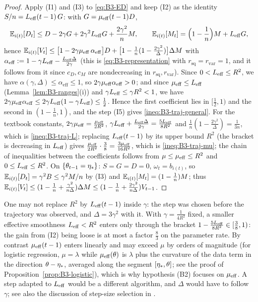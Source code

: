 \begin{proof}
Apply (I1) and (I3) to \eqref{eq:B3-ED} and keep (I2) as the identity $S/n=L_{\mathrm{eff}}(t-1)\,G$: with $G=\mu_{\mathrm{eff}}(t-1)D$,
\[
\mathbb{E}_{i(t)}[D_t]\le D-2\gamma G+2\gamma^2L_{\mathrm{eff}} G+\frac{2\gamma^2}{n}M,\qquad
\mathbb{E}_{i(t)}[M_t]=\Big(1-\frac1n\Big)M+L_{\mathrm{eff}} G,
\]
hence $\mathbb{E}_{i(t)}[V_t]\le\big[1-2\gamma\mu_{\mathrm{eff}}\,\alpha_{\mathrm{eff}}\big]D+\big[1-\frac1n(1-\frac{2\gamma^2}{\Delta})\big]\Delta M$ with $\alpha_{\mathrm{eff}}:=1-\gamma L_{\mathrm{eff}}-\frac{L_{\mathrm{eff}}\Delta}{2\gamma}$ (this is \eqref{eq:B3-representation} with $r_{\mathrm{sq}}=r_{\mathrm{var}}=1$, and it follows from it since $c_D,c_M$ are nondecreasing in $r_{\mathrm{sq}},r_{\mathrm{var}}$). Since $0<L_{\mathrm{eff}}\le R^2$, we have $\alpha(\gamma,\Delta)\le\alpha_{\mathrm{eff}}\le1$, so $2\gamma\mu_{\mathrm{eff}}\alpha_{\mathrm{eff}}>0$; and since $\mu_{\mathrm{eff}}\le L_{\mathrm{eff}}$ (Lemma~\ref{lem:B3-ranges}(i)) and $\gamma L_{\mathrm{eff}}\le\gamma R^2<1$, we have $2\gamma\mu_{\mathrm{eff}}\alpha_{\mathrm{eff}}\le2\gamma L_{\mathrm{eff}}(1-\gamma L_{\mathrm{eff}})\le\frac12$. Hence the first coefficient lies in $[\frac12,1)$ and the second in $(1-\frac1n,1)$, and the step (I5) gives \eqref{ineq:B3-traj-general}. For the textbook constants, $2\gamma\mu_{\mathrm{eff}}=\frac{\mu_{\mathrm{eff}}}{2R^2}$, $\gamma L_{\mathrm{eff}}+\frac{L_{\mathrm{eff}}\Delta}{2\gamma}=\frac{5L_{\mathrm{eff}}}{8R^2}$ and $\frac1n(1-\frac{2\gamma^2}\Delta)=\frac1{3n}$, which is \eqref{ineq:B3-traj-L}; replacing $L_{\mathrm{eff}}(t-1)$ by its upper bound $R^2$ (the bracket is decreasing in $L_{\mathrm{eff}}$) gives $\frac{\mu_{\mathrm{eff}}}{2R^2}\cdot\frac38=\frac{3\mu_{\mathrm{eff}}}{16R^2}$, which is \eqref{ineq:B3-traj-mu}; the chain of inequalities between the coefficients follows from $\mu\le\mu_{\mathrm{eff}}\le R^2$ and $0\le L_{\mathrm{eff}}\le R^2$. On $\{\theta_{t-1}=\eta_\ast\}$: $S=G=D=0$, $\omega_t=b_{i(t)}$, so $\mathbb{E}_{i(t)}[D_t]=\gamma^2B\le\gamma^2M/n$ by (I3) and $\mathbb{E}_{i(t)}[M_t]=(1-\frac1n)M$; thus $\mathbb{E}_{i(t)}[V_t]\le(1-\frac1n+\frac{\gamma^2}{n\Delta})\Delta M\le(1-\frac1n+\frac{2\gamma^2}{n\Delta})V_{t-1}$.
\end{proof}

\begin{remark}\label{rem:B3-fixed-step}
One may not replace $R^2$ by $L_{\mathrm{eff}}(t-1)$ inside $\gamma$: the step was chosen before the trajectory was observed, and $\Delta=3\gamma^2$ with it. With $\gamma=\frac1{4R^2}$ fixed, a smaller effective smoothness $L_{\mathrm{eff}}<R^2$ enters only through the bracket $1-\frac{5L_{\mathrm{eff}}}{8R^2}\in[\frac38,1)$: the gain from (I2) being loose is at most a factor $\frac83$ on the parameter rate. By contrast $\mu_{\mathrm{eff}}(t-1)$ enters linearly and may exceed $\mu$ by orders of magnitude (for logistic regression, $\mu=\lambda$ while $\mu_{\mathrm{eff}}(\theta)$ is $\lambda$ plus the curvature of the data term in the direction $\theta-\eta_\ast$, averaged along the segment $[\eta_\ast,\theta]$; see the proof of Proposition~\ref{prop:B3-logistic}), which is why hypothesis (B2) focuses on $\mu_{\mathrm{eff}}$. A step adapted to $L_{\mathrm{eff}}$ would be a different algorithm, and $\Delta$ would have to follow $\gamma$; see also the discussion of step-size selection in \cite[Sec.~3.A]{gower2020variance}.
\end{remark}

